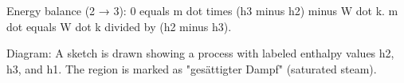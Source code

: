 Energy balance (2 → 3):  
0 equals m dot times (h3 minus h2) minus W dot k.  
m dot equals W dot k divided by (h2 minus h3).  

Diagram:  
A sketch is drawn showing a process with labeled enthalpy values h2, h3, and h1. The region is marked as "gesättigter Dampf" (saturated steam).